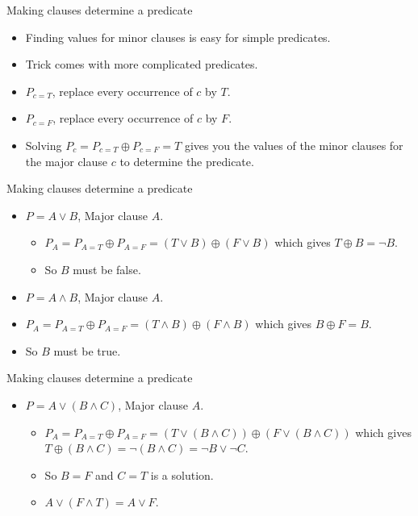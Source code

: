 \documentclass{beamer}
\begin{document}
\begin{frame}{Making clauses determine a predicate}
  \begin{itemize}
  \item Finding values for minor clauses is easy for simple
    predicates.
  \item Trick comes with more complicated predicates.
  \item $P_{c=T}$, replace every occurrence of $c$ by $T$.
  \item $P_{c=F}$, replace every occurrence of $c$ by $F$.
  \item Solving $P_c = P_{c=T} \oplus P_{c=F} = T$ gives you the
    values of the minor clauses for the major clause $c$ to determine
    the predicate.
  \end{itemize}
  
\end{frame}
\begin{frame}{Making clauses determine a predicate}
  \begin{itemize}
  \item $P=A\lor B$, Major clause $A$.
    \begin{itemize}
    \item $P_A = P_{A=T} \oplus P_{A=F} = (T \lor B) \oplus (F
      \lor B)$ which gives $T \oplus B = \neg B$. 
    \item So $B$ must be false.
    \end{itemize}
    \item $P=A\land B$, Major clause $A$.
    \item $P_A = P_{A=T} \oplus P_{A=F} = (T \land B) \oplus (F
      \land B)$ which gives $B \oplus F =  B$. 
    \item So $B$ must be true.
  \end{itemize}
\end{frame}
\begin{frame}{Making clauses determine a predicate}
  \begin{itemize}
  \item $P=A\lor (B\land C)$, Major clause $A$.
    \begin{itemize}
    \item $P_A = P_{A=T} \oplus P_{A=F} = (T \lor (B\land C)) \oplus
      (F 
      \lor (B\land C))$ which gives $T\oplus (B\land C) = \neg (B
      \land C) = \neg B \lor \neg C$.
    \item So $B=F$ and $C=T$ is a solution.
    \item $A \lor (F \land T) = A \lor F$. 
    \end{itemize}

  \end{itemize}
\end{frame}
\end{document}
